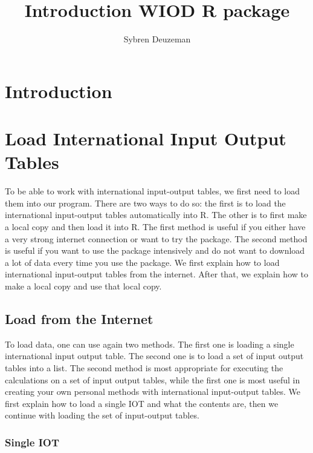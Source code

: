 \documentclass[10pt,a4paper]{paper}
\title{Introduction WIOD R package}
\author{Sybren Deuzeman}
\begin{document}
	\maketitle
	
	\section{Introduction}
	
	\section{Load International Input Output Tables}
	
	To be able to work with international input-output tables, we first need to load them into our program. There are two ways to do so: the first is to load the international input-output tables automatically into R. The other is to first make a local copy and then load it into R. The first method is useful if you either have a very strong internet connection or want to try the package. The second method is useful if you want to use the package intensively and do not want to download a lot of data every time you use the package. We first explain how to load international input-output tables from the internet. After that, we explain how to make a local copy and use that local copy.
	
	\subsection{Load from the Internet}
	
	To load data, one can use again two methods. The first one is loading a single international input output table. The second one is to load a set of input output tables into a list. The second method is most appropriate for executing the calculations on a set of input output tables, while the first one is most useful in creating your own personal methods with international input-output tables. We first explain how to load a single IOT and what the contents are, then we continue with loading the set of input-output tables. 
	
	\subsubsection{Single IOT}
	
\end{document}
